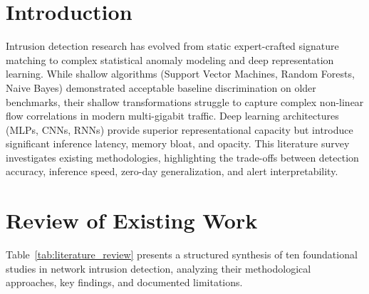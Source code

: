 \documentclass[12pt,a4paper]{report}
\begin{document}
\section{Introduction}
Intrusion detection research has evolved from static expert-crafted signature matching to complex statistical anomaly modeling and deep representation learning. While shallow algorithms (Support Vector Machines, Random Forests, Naive Bayes) demonstrated acceptable baseline discrimination on older benchmarks, their shallow transformations struggle to capture complex non-linear flow correlations in modern multi-gigabit traffic. Deep learning architectures (MLPs, CNNs, RNNs) provide superior representational capacity but introduce significant inference latency, memory bloat, and opacity. This literature survey investigates existing methodologies, highlighting the trade-offs between detection accuracy, inference speed, zero-day generalization, and alert interpretability.

\section{Review of Existing Work}
Table~\ref{tab:literature_review} presents a structured synthesis of ten foundational studies in network intrusion detection, analyzing their methodological approaches, key findings, and documented limitations.
\end{document}

